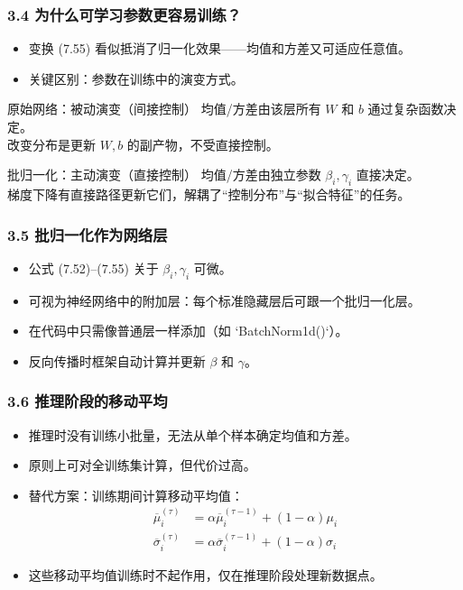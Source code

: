 \documentclass[t,aspectratio=169]{beamer} %
\begin{document}
\begin{frame}
    \frametitle{3.4 为什么可学习参数更容易训练？}
    \begin{itemize}
        \item 变换 (7.55) 看似抵消了归一化效果——均值和方差又可适应任意值。
        \item \alert{关键区别}：参数在训练中的演变方式。
    \end{itemize}
    \begin{block}{原始网络：被动演变（间接控制）}
        均值/方差由该层所有 $W$ 和 $b$ 通过复杂函数决定。\\
        改变分布是更新 $W,b$ 的\alert{副产物}，不受直接控制。
    \end{block}
    \begin{block}{批归一化：主动演变（直接控制）}
        均值/方差由\alert{独立参数} $\beta_i, \gamma_i$ 直接决定。\\
        梯度下降有直接路径更新它们，\alert{解耦}了“控制分布”与“拟合特征”的任务。
    \end{block}
\end{frame}

\begin{frame}
    \frametitle{3.5 批归一化作为网络层}
    \begin{itemize}
        \item 公式 (7.52)--(7.55) 关于 $\beta_i, \gamma_i$ \alert{可微}。
        \item 可视为神经网络中的\alert{附加层}：每个标准隐藏层后可跟一个批归一化层。
        \item 在代码中只需像普通层一样添加（如 `BatchNorm1d()`）。
        \item 反向传播时框架自动计算并更新 $\beta$ 和 $\gamma$。
    \end{itemize}
\end{frame}

\begin{frame}
    \frametitle{3.6 推理阶段的移动平均}
    \begin{itemize}
        \item 推理时没有训练小批量，无法从单个样本确定均值和方差。
        \item 原则上可对全训练集计算，但\alert{代价过高}。
        \item 替代方案：训练期间计算\alert{移动平均值}：
        \begin{align}
            \overline{\mu}_i^{(\tau)} &= \alpha \overline{\mu}_i^{(\tau-1)} + (1-\alpha) \mu_i \tag{7.56} \\
            \overline{\sigma}_i^{(\tau)} &= \alpha \overline{\sigma}_i^{(\tau-1)} + (1-\alpha) \sigma_i \tag{7.57}
        \end{align}
        \item 这些移动平均值\alert{训练时不起作用}，仅在推理阶段处理新数据点。
    \end{itemize}
\end{frame}
\end{document}
